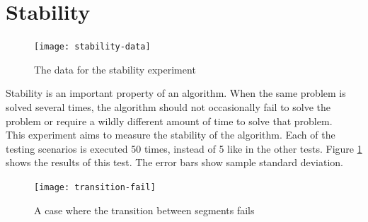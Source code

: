 \clearpage
\section{Stability}
\label{subsec:stability}
\begin{figure}[]
	\centering
	\texttt{[image: stability-data]}
	\caption{The data for the stability experiment}
	\label{fig:stability-data}
\end{figure}
Stability is an important property of an algorithm. When the same problem is solved several times, the algorithm should not occasionally fail to solve the problem or require a wildly different amount of time to solve that problem. \\
This experiment aims to measure the stability of the algorithm. Each of the testing scenarios is executed 50 times, instead of 5 like in the other tests. Figure \ref{fig:stability-data} shows the results of this test. The error bars show sample standard deviation. \\
\begin{figure}[h]
	\centering
	\texttt{[image: transition-fail]}
	\caption{A case where the transition between segments fails}
	\label{fig:transition-fail}
\end{figure}


